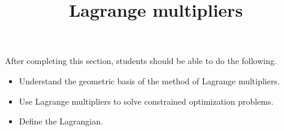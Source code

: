 \documentclass{ximera}
\title{Lagrange multipliers}
\begin{document}
\begin{abstract}
\end{abstract}

\maketitle

\begin{sectionOutcomes}

After completing this section, students should be able to do the following.

\begin{itemize}
\item Understand the geometric basis of the method of Lagrange
  multipliers.
\item Use Lagrange multipliers to solve constrained optimization
  problems.
\item Define the Lagrangian.
\end{itemize}

\end{sectionOutcomes}
\end{document}
